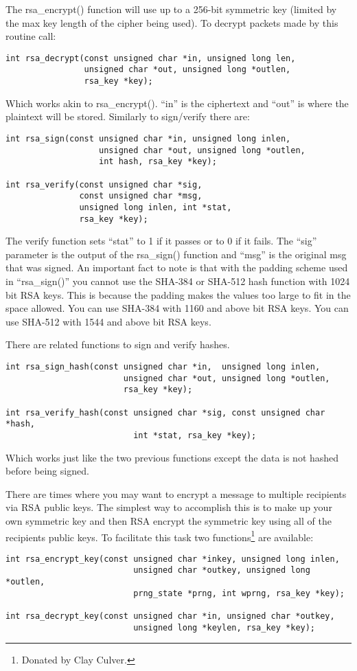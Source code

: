\documentclass{book}
\begin{document}
The rsa\_encrypt() function will use up to a 256-bit symmetric key (limited by the max key length of the cipher being
used).  To decrypt packets made by this routine call:
\begin{verbatim}
int rsa_decrypt(const unsigned char *in, unsigned long len, 
                unsigned char *out, unsigned long *outlen, 
                rsa_key *key);
\end{verbatim}
Which works akin to rsa\_encrypt().  ``in'' is the ciphertext and ``out'' is where the plaintext will be stored.  Similarly
to sign/verify there are:
 
\begin{verbatim}
int rsa_sign(const unsigned char *in, unsigned long inlen, 
                   unsigned char *out, unsigned long *outlen, 
                   int hash, rsa_key *key);

int rsa_verify(const unsigned char *sig,
               const unsigned char *msg, 
               unsigned long inlen, int *stat, 
               rsa_key *key);
\end{verbatim}

The verify function sets ``stat'' to 1 if it passes or to 0 if it fails.  The ``sig'' parameter is the output of the
rsa\_sign() function and ``msg'' is the original msg that was signed.  An important fact to note is that with
the padding scheme used in ``rsa\_sign()'' you cannot use the SHA-384 or SHA-512 hash function with 1024 bit
RSA keys.  This is because the padding makes the values too large to fit in the space allowed.  You can use SHA-384
with 1160 and above bit RSA keys.  You can use SHA-512 with 1544 and above bit RSA keys.

There are related functions to sign and verify hashes.
\begin{verbatim}
int rsa_sign_hash(const unsigned char *in,  unsigned long inlen, 
                        unsigned char *out, unsigned long *outlen, 
                        rsa_key *key);

int rsa_verify_hash(const unsigned char *sig, const unsigned char *hash,
                          int *stat, rsa_key *key);
\end{verbatim}
Which works just like the two previous functions except the data is not hashed before being signed.

There are times where you may want to encrypt a message to multiple recipients via RSA public keys.  The simplest way to
accomplish this is to make up your own symmetric key and then RSA encrypt the symmetric key using all of the recipients
public keys.  To facilitate this task two functions\footnote{Donated by Clay Culver.} are available:
\begin{verbatim}
int rsa_encrypt_key(const unsigned char *inkey, unsigned long inlen,
                          unsigned char *outkey, unsigned long *outlen,
                          prng_state *prng, int wprng, rsa_key *key);

int rsa_decrypt_key(const unsigned char *in, unsigned char *outkey, 
                          unsigned long *keylen, rsa_key *key);
\end{verbatim}
\end{document}
